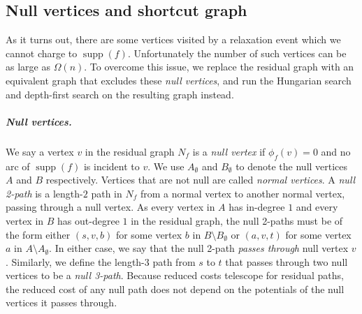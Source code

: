 \documentclass[a4paper,UKenglish]{socg-lipics-v2018}
\makeatletter
\def\fsupply{\phi}
\def\supp{\operatorname{supp}}
\theoremstyle{plain}
\numberwithin{figure}{section}
\renewcommand{\paragraph}{\subparagraph}
\def\EMPH#1{\textcolor{BrickRed}{{\emph{#1}}}}
\def\n@te#1{\textsf{\boldmath \textbf{$\langle\!\langle$#1$\rangle\!\rangle$}}\leavevmode}
\def\note#1{\textcolor{red}{\n@te{#1}}}
\makeatother
\begin{document}
\subsection{Null vertices and shortcut graph}


As it turns out, there are some vertices visited by a relaxation event which we cannot charge to $\supp(f)$.
Unfortunately the number of such vertices can be as large as $\Omega(n)$.
%
To overcome this issue, we replace the residual graph with an equivalent graph that excludes these \emph{null vertices},
and run the Hungarian search and depth-first search on the resulting graph instead.

\paragraph{Null vertices.}
We say a vertex $v$ in the residual graph $N_f$ is a \EMPH{null vertex} if $\fsupply_f(v) = 0$ and no arc of $\supp(f)$ is incident to $v$.
We use \EMPH{$A_\emptyset$} and \EMPH{$B_\emptyset$} to denote the null vertices $A$ and $B$ respectively.
Vertices that are not null are called \EMPH{normal vertices}.
%
A \EMPH{null 2-path} is a length-$2$ path in $N_f$ from a normal vertex to another normal vertex, passing through a null vertex.
As every vertex in $A$ has in-degree $1$ and every vertex in $B$ has out-degree $1$ in the residual graph, the null 2-paths must be of the form either $(s, v, b)$ for some vertex $b$ in $B \setminus B_\emptyset$ or $(a, v, t)$ for some vertex $a$ in $A \setminus A_\emptyset$.
In either case, we say that the null 2-path \EMPH{passes through} null vertex $v$.
%
Similarly, we define the length-$3$ path from $s$ to $t$ that passes through two null
vertices to be a \EMPH{null 3-path}.
%
Because reduced costs telescope for residual paths, the reduced cost of any null path does not depend on the potentials of the null vertices it passes through.
\end{document}
